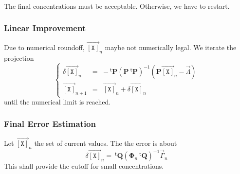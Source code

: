 \documentclass[aps,twocolumn]{revtex4}
\newcommand{\myconc}[1]{\left\lbrack #1 \right\rbrack}
\newcommand{\mychem}[1]{{\mathtt{#1}}}
\newcommand{\mymat}[1]{\boldsymbol{#1}}
\newcommand{\mytrn}[1]{{\!\!~^{\mathsf{t}}{#1}}}
\newcommand{\myvec}[1]{\overrightarrow{#1}}
\newcommand{\vecX}{\myvec{\myconc{\mychem{X}}}}
\begin{document}
The final concentrations must be acceptable. Otherwise,  we have to restart.


\subsubsection{Linear Improvement}
Due to numerical roundoff, $\vecX_n$ maybe not numerically legal.
We iterate the projection
\begin{equation}
	\left\lbrace
	\begin{array}{rcl}
	\delta \vecX_n & = & - \mytrn{\mymat{P}} \left(\mymat{P} \mytrn{\mymat{P}}\right)^{-1} \left( \mymat{P}\vecX_n - \vec{\Lambda} \right)\\
	\vecX_{n+1}    & = & \vecX_n + \delta\vecX_n
	\end{array}
	\right.
\end{equation}
until the numerical limit is reached.

\subsubsection{Final Error Estimation}
Let $\vecX_n$ the set of current values. The the error is about
\begin{equation}
	\delta \vecX_n = \mytrn{\mymat{Q}}\left(\mymat{\Phi}_n\mytrn{\mymat{Q}}\right)^{-1} \vec{\Gamma}_n
\end{equation}
This shall provide the cutoff for small concentrations.
\end{document}
